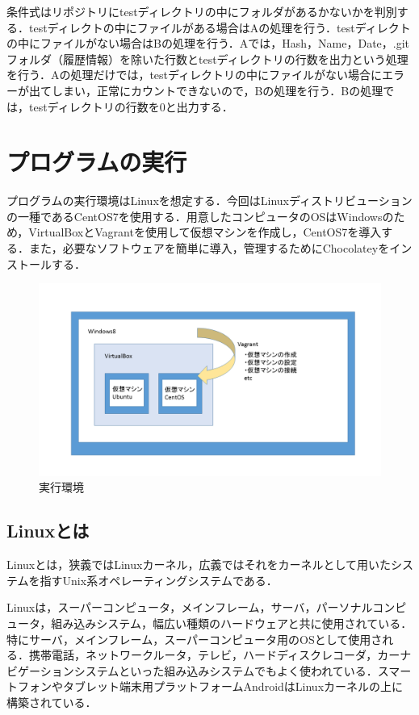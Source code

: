 条件式はリポジトリにtestディレクトリの中にフォルダがあるかないかを判別する．testディレクトの中にファイルがある場合はAの処理を行う．testディレクトの中にファイルがない場合はBの処理を行う．Aでは，Hash，Name，Date，.gitフォルダ（履歴情報）を除いた行数とtestディレクトリの行数を出力という処理を行う．Aの処理だけでは，testディレクトリの中にファイルがない場合にエラーが出てしまい，正常にカウントできないので，Bの処理を行う．Bの処理では，testディレクトリの行数を0と出力する．

\newpage

\section{プログラムの実行}
プログラムの実行環境はLinuxを想定する．今回はLinuxディストリビューションの一種であるCentOS7を使用する．用意したコンピュータのOSはWindowsのため，VirtualBoxとVagrantを使用して仮想マシンを作成し，CentOS7を導入する．また，必要なソフトウェアを簡単に導入，管理するためにChocolateyをインストールする．

\begin{figure}[h]
\centering
\includegraphics[width=13cm]{kankyou.png}
\caption{実行環境}
\end{figure}

\newpage

\subsection{Linuxとは}
Linuxとは，狭義ではLinuxカーネル，広義ではそれをカーネルとして用いたシステムを指すUnix系オペレーティングシステムである．

Linuxは，スーパーコンピュータ，メインフレーム，サーバ，パーソナルコンピュータ，組み込みシステム，幅広い種類のハードウェアと共に使用されている．特にサーバ，メインフレーム，スーパーコンピュータ用のOSとして使用される．携帯電話，ネットワークルータ，テレビ，ハードディスクレコーダ，カーナビゲーションシステムといった組み込みシステムでもよく使われている．スマートフォンやタブレット端末用プラットフォームAndroidはLinuxカーネルの上に構築されている．


